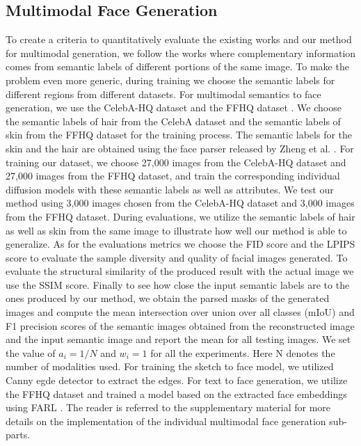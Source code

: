 \documentclass[10pt,twocolumn,letterpaper]{article}
\begin{document}
 \subsection{Multimodal Face Generation} To create a criteria to quantitatively evaluate the existing works and our method for multimodal generation, we follow the works \cite{wu2018multimodal} where complementary information comes from semantic labels of different portions of the same image. To make the problem even more generic, during training we choose the  semantic labels for different regions from different datasets. For multimodal semantics to face generation, we use the CelebA-HQ dataset \cite{karras2017progressive} and the FFHQ dataset \cite{karras2019style}. We choose the semantic labels of hair from the CelebA dataset and the semantic labels of skin from the FFHQ dataset for the training process. The semantic labels for the skin and the hair are obtained using the face parser released by Zheng et al. \cite{zheng2021farl}. For training our dataset, we choose 27,000 images from the CelebA-HQ dataset and 27,000 images from the FFHQ dataset, and train the corresponding individual diffusion models with these semantic labels as well as attributes. We test our method using 3,000 images chosen from the CelebA-HQ dataset and 3,000  images from the FFHQ dataset. During evaluations, we utilize the semantic labels of hair as well as skin from the same image to illustrate how well our method is able to generalize. As for the evaluations metrics we choose the FID score \cite{heusel2017gans} and the LPIPS score \cite{zhang2018perceptual}  to evaluate the sample diversity and quality of facial images generated. To evaluate the structural similarity of the produced result with the actual image we use the SSIM score. Finally to see how close the input semantic labels are to the ones produced by our method, we obtain the parsed masks of the generated images and compute the  mean intersection over union over all classes (mIoU) and F1 precision scores of the semantic images obtained from the reconstructed image and the input semantic image and report the mean for all testing images. We set the value of $a_i=1/N$ and $w_i=1$ for all the experiments. Here N denotes the number of modalities used. For training the sketch to face model, we utilized Canny egde detector\cite{ding2001canny} to extract the edges. For text to face generation, we utilize the FFHQ dataset and trained a model based on the extracted face embeddings using FARL \cite{zheng2021farl}. The reader is referred to the supplementary material for more details on the implementation of the individual multimodal face generation sub-parts.
\end{document}
